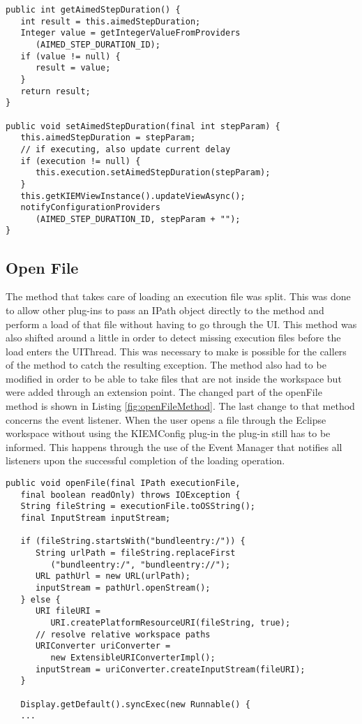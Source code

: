 \begin{lstlisting}
public int getAimedStepDuration() {
   int result = this.aimedStepDuration;
   Integer value = getIntegerValueFromProviders
      (AIMED_STEP_DURATION_ID);
   if (value != null) {
      result = value;
   }
   return result;
}

public void setAimedStepDuration(final int stepParam) {
   this.aimedStepDuration = stepParam;
   // if executing, also update current delay
   if (execution != null) {
      this.execution.setAimedStepDuration(stepParam);
   }
   this.getKIEMViewInstance().updateViewAsync();
   notifyConfigurationProviders
      (AIMED_STEP_DURATION_ID, stepParam + "");
}
\end{lstlisting}


\subsection{Open File}
The method that takes care of loading an execution file was split. This was done to allow
other plug-ins to pass an IPath object directly to the method and perform a load of that file without
having to go through the \ac{UI}. This method was also shifted around a little in order to detect
missing execution files before the load enters the UIThread. This was necessary to make is possible for
the callers of the method to catch the resulting exception.
The method also had to be modified in order to be able to take files that are not inside the workspace
but were added through an extension point. The changed part of the openFile method is shown in 
Listing \ref{fig:openFileMethod}.
The last change to that method concerns the event listener. When the user opens a file through the
Eclipse workspace without using the \ac{KIEMConfig} plug-in the plug-in still has to be informed.
This happens through the use of the Event Manager that notifies all listeners upon the successful
completion of the loading operation.

\begin{lstlisting}
public void openFile(final IPath executionFile, 
   final boolean readOnly) throws IOException {
   String fileString = executionFile.toOSString();
   final InputStream inputStream;
   
   if (fileString.startsWith("bundleentry:/")) {
      String urlPath = fileString.replaceFirst
         ("bundleentry:/", "bundleentry://");
      URL pathUrl = new URL(urlPath);
      inputStream = pathUrl.openStream();
   } else {
      URI fileURI = 
         URI.createPlatformResourceURI(fileString, true);
      // resolve relative workspace paths
      URIConverter uriConverter = 
         new ExtensibleURIConverterImpl();
      inputStream = uriConverter.createInputStream(fileURI);
   }

   Display.getDefault().syncExec(new Runnable() {
   ...
\end{lstlisting}

